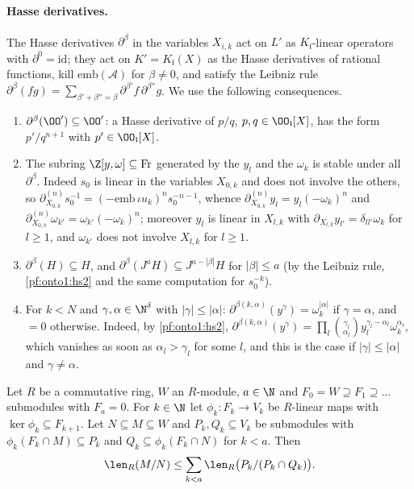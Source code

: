 \paragraph{Hasse derivatives.} The Hasse derivatives $\partial^\beta$ in the variables $X_{i,k}$ act on $L'$ as
$K_{\mathfrak l}$-linear operators with $\partial^0=\mathrm{id}$; they act on $K'=K_{\mathfrak l}(X)$ as the Hasse derivatives of
rational functions, kill $\mathrm{emb}(\mathcal A)$ for $\beta\ne0$, and satisfy the Leibniz rule
$\partial^\beta(fg)=\sum_{\beta'+\beta''=\beta}\partial^{\beta'}f\,\partial^{\beta''}g$. We use the following consequences.
\begin{enumerate}[label=(\roman*)]
\item\label{pf:onto1:hs1} $\partial^\beta(\OO')\subseteq\OO'$: a Hasse derivative of $p/q$, $p,q\in\OO_{\mathfrak l}[X]$, has the form
$p'/q^{n+1}$ with $p'\in\OO_{\mathfrak l}[X]$.
\item\label{pf:onto1:hs2} The subring $\Z[y,\omega]\subseteq\mathrm{Fr}$ generated by the $y_l$ and the $\omega_k$ is stable under
all $\partial^\beta$. Indeed $s_0$ is linear in the variables $X_{0,k}$ and does not involve the others, so
$\partial^{(n)}_{X_{0,k}}s_0^{-1}=(-\mathrm{emb}\,\iota u_k)^ns_0^{-n-1}$, whence $\partial^{(n)}_{X_{0,k}}y_l=y_l(-\omega_k)^n$ and
$\partial^{(n)}_{X_{0,k}}\omega_{k'}=\omega_{k'}(-\omega_k)^n$; moreover $y_l$ is linear in $X_{l,k}$ with
$\partial_{X_{l,k}}y_{l'}=\delta_{ll'}\omega_k$ for $l\ge1$, and $\omega_{k'}$ does not involve $X_{l,k}$ for $l\ge1$.
\item\label{pf:onto1:hs3} $\partial^\beta(H)\subseteq H$, and $\partial^\beta(J^aH)\subseteq J^{a-|\beta|}H$ for $|\beta|\le a$ (by the
Leibniz rule, \ref{pf:onto1:hs2} and the same computation for $s_0^{-k}$).
\item\label{pf:onto1:hs4} For $k<N$ and $\gamma,\alpha\in\N^\delta$ with $|\gamma|\le|\alpha|$: $\partial^{\beta(k,\alpha)}(y^\gamma)=
\omega_k^{|\alpha|}$ if $\gamma=\alpha$, and $=0$ otherwise. Indeed, by \ref{pf:onto1:hs2},
$\partial^{\beta(k,\alpha)}(y^\gamma)=\prod_l\binom{\gamma_l}{\alpha_l}y_l^{\gamma_l-\alpha_l}\omega_k^{\alpha_l}$, which vanishes as soon as
$\alpha_l>\gamma_l$ for some $l$, and this is the case if $|\gamma|\le|\alpha|$ and $\gamma\ne\alpha$.
\end{enumerate}

\begin{lemma}[Filtrations]\label{pf:onto1:filt}
Let $R$ be a commutative ring, $W$ an $R$-module, $a\in\N$ and $F_0=W\supseteq F_1\supseteq\dots$ submodules with $F_a=0$.
For $k\in\N$ let $\phi_k\colon F_k\to V_k$ be $R$-linear maps with $\ker\phi_k\subseteq F_{k+1}$. Let $N\subseteq M\subseteq W$ and
$P_k,Q_k\subseteq V_k$ be submodules with $\phi_k(F_k\cap M)\subseteq P_k$ and $Q_k\subseteq\phi_k(F_k\cap N)$ for $k<a$. Then
\[
\len_R(M/N)\le\sum_{k<a}\len_R\bigl(P_k/(P_k\cap Q_k)\bigr).
\]
\end{lemma}

